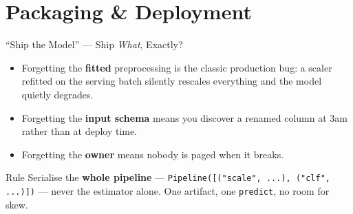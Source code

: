 \section{Packaging \& Deployment}

\begin{frame}{``Ship the Model'' --- Ship \emph{What}, Exactly?}

    \centering

    \vspace{1.0em}
    \begin{itemize}
        \item Forgetting the \textbf{fitted} preprocessing is the classic production bug: a scaler refitted
              on the serving batch silently rescales everything and the model quietly degrades.
        \item Forgetting the \textbf{input schema} means you discover a renamed column at 3am rather than
              at deploy time.
        \item Forgetting the \textbf{owner} means nobody is paged when it breaks.
    \end{itemize}

    \vspace{0.6em}
    \begin{block}{Rule}
        Serialise the \textbf{whole pipeline} --- \texttt{Pipeline([("scale", ...), ("clf", ...)])} --- never
        the estimator alone. One artifact, one \texttt{predict}, no room for skew.
    \end{block}

\end{frame}
